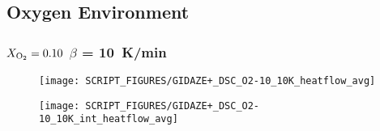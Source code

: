 \newpage
\subsection{Oxygen Environment}
\label{DSC_O2}
\subsubsection{$X_{\rm O_2}=0.10$ $\beta$ = 10~K/min}
\begin{minipage}{0.5\textwidth}
\begin{figure}[H]
{\texttt{[image: SCRIPT\_FIGURES/GIDAZE+\_DSC\_O2-10\_10K\_heatflow\_avg]}}\\
\end{figure}
\end{minipage} 
\begin{minipage}{0.35\textwidth}
\begin{figure}[H]
{\texttt{[image: SCRIPT\_FIGURES/GIDAZE+\_DSC\_O2-10\_10K\_int\_heatflow\_avg]}}\\
\end{figure}
\end{minipage}\\
\vfill

